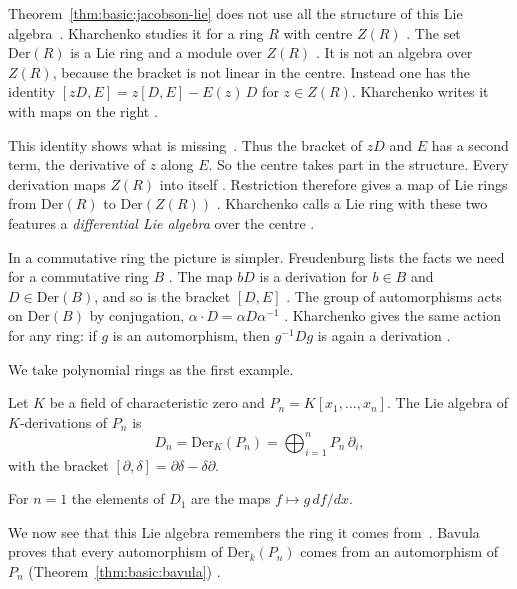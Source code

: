Theorem~\ref{thm:basic:jacobson-lie} does not use all the structure of this
Lie algebra~\cite[identity~(1), p.~7]{Kharchenko1991}. Kharchenko studies it for a ring $R$ with centre $Z(R)$
\cite[p.~7]{Kharchenko1991}. The set $\mathrm{Der}(R)$ is a Lie ring and a
module over $Z(R)$ \cite[p.~7]{Kharchenko1991}. It is not an algebra over
$Z(R)$, because the bracket is not linear in the centre. Instead one has the
identity $[zD,E] = z[D,E] - E(z)\,D$ for $z \in Z(R)$. Kharchenko writes it
with maps on the right \cite[identity~(1), p.~7]{Kharchenko1991}.

This identity shows what is missing~\cite[Definition~1.2.3, p.~8]{Kharchenko1991}. Thus the bracket of $zD$ and $E$ has a
second term, the derivative of $z$ along $E$. So the centre takes part in the
structure. Every derivation maps $Z(R)$ into itself
\cite[p.~8]{Kharchenko1991}. Restriction therefore gives a map of Lie rings
from $\mathrm{Der}(R)$ to $\mathrm{Der}(Z(R))$ \cite[p.~8]{Kharchenko1991}.
Kharchenko calls a Lie ring with these two features a \emph{differential Lie
algebra} over the centre \cite[Definition~1.2.3, p.~8]{Kharchenko1991}.

In a commutative ring the picture is simpler.
Freudenburg lists the
facts we need for a commutative ring $B$ \cite[p.~2]{Freudenburg2017}. The map
$bD$ is a derivation for $b \in B$ and $D \in \mathrm{Der}(B)$, and so is the
bracket $[D,E]$ \cite[(C.6), p.~2]{Freudenburg2017}. The group of
automorphisms acts on $\mathrm{Der}(B)$ by conjugation, $\alpha \cdot D =
\alpha D \alpha^{-1}$ \cite[(C.5), (C.6), p.~2]{Freudenburg2017}. Kharchenko
gives the same action for any ring: if $g$ is an automorphism, then $g^{-1} D
g$ is again a derivation \cite[\S1.2.6, p.~11]{Kharchenko1991}.

We take polynomial rings as the first example.

\begin{example}\label{ex:basic:polynomials}
Let $K$ be a field of characteristic zero and $P_n=K[x_1,\dots,x_n]$. The Lie
algebra of $K$-derivations of $P_n$ is
\[
D_n=\mathrm{Der}_K(P_n)=\bigoplus_{i=1}^{n}P_n\,\partial_i ,
\]
with the bracket $[\partial,\delta]=\partial\delta-\delta\partial$.
\end{example}

For $n = 1$ the elements of $D_1$ are the maps $f \mapsto g\,df/dx$.

We now see that this Lie algebra remembers the ring it comes from~\cite[Theorem~1.1,
p.~1]{Bavula2017}. Bavula
proves that every automorphism of $\mathrm{Der}_k(P_n)$ comes from an
automorphism of $P_n$ (Theorem~\ref{thm:basic:bavula}) \cite[Theorem~1.1,
p.~1]{Bavula2017}.


